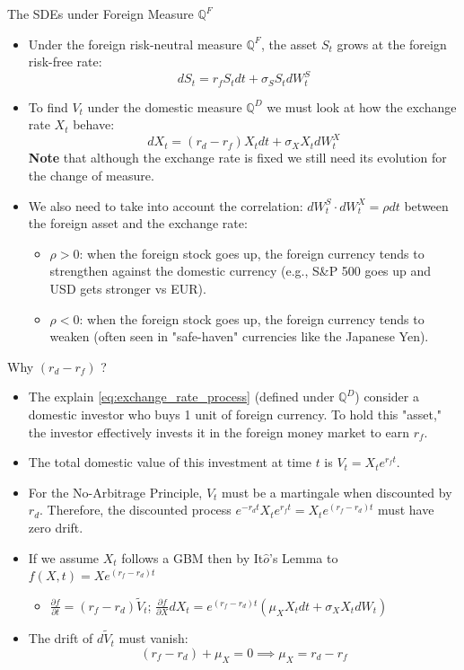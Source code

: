 \documentclass{beamer}
\begin{document}
\begin{frame}{The SDEs under Foreign Measure $\mathbb{Q}^F$}
	\begin{itemize}
	\item Under the foreign risk-neutral measure $\mathbb{Q}^F$, the asset $S_t$ grows at the foreign risk-free rate:
	\begin{equation}
		dS_t= r_f S_t dt + \sigma_S S_t dW_t^S
	\end{equation}
	\item To find $V_t$ under the domestic measure $\mathbb{Q}^D$ we must look at how the exchange rate $X_t$ behave:
	\begin{equation}
		dX_t=(r_d-r_f)X_t dt + \sigma_X X_t dW_t^X
		\label{eq:exchange_rate_process}
	\end{equation}
	\textbf{Note} that although the exchange rate is fixed we still need its evolution for the change of measure.
	\item We also need to take into account the correlation: $dW_t^S\cdot dW_t^X = \rho dt$ between the foreign asset and the exchange rate:
		\begin{itemize}
			\item $\rho >0$: when the foreign stock goes up, the foreign currency tends to strengthen against the domestic currency (e.g., S\&P 500 goes up and USD gets stronger vs EUR).
			\item $\rho <0$: when the foreign stock goes up, the foreign currency tends to weaken (often seen in "safe-haven" currencies like the Japanese Yen).
		\end{itemize}
	\end{itemize}
\end{frame}

\begin{frame}{Why $(r_d-r_f)$ ?}
	\begin{itemize}
	\item The explain \cref{eq:exchange_rate_process} (defined under $\mathbb{Q}^D$) consider a domestic investor who buys 1 unit of foreign currency. To hold this "asset," the investor effectively invests it in the foreign money market to earn $r_f$.
	\item The total domestic value of this investment at time $t$ is $V_t = X_t e^{r_f t}$.
	\item For the No-Arbitrage Principle, $V_t$ must be a martingale when discounted by $r_d$. Therefore, the discounted process $e^{-r_d t}X_t e^{r_f t}=X_t e^{(r_f-r_d)t}$ must have zero drift.
	\item If we assume $X_t$ follows a GBM then by It$\hat{o}$'s Lemma  to $f(X,t) = X e^{(r_f - r_d)t}$
	\begin{itemize}
		\item $\frac{\partial f}{\partial t} = (r_f - r_d)\tilde{V}_t$; \quad $\frac{\partial f}{\partial X} dX_t = e^{(r_f - r_d)t}(\mu_X X_t dt + \sigma_X X_t dW_t)$
	\end{itemize}
	\item 	The drift of $d\tilde{V}_t$ must vanish:
	\[ (r_f - r_d) + \mu_X = 0 \implies \mu_X = r_d - r_f \]
	\end{itemize}
\end{frame}
\end{document}
